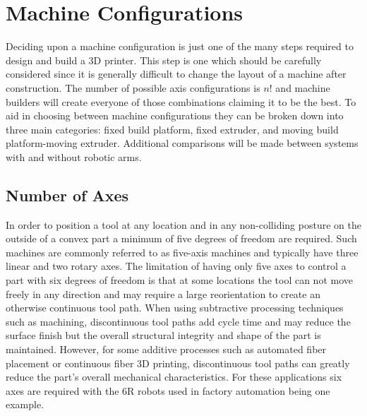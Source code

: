 \documentclass[main.tex]{subfiles}
\begin{document}
\chapter{Machine Configurations}
Deciding upon a machine configuration is just one of the many steps required to design and build a 3D printer.
This step is one which should be carefully considered since it is generally difficult to change the layout of a machine after construction.
The number of possible axis configurations is $n!$ and machine builders will create everyone of those combinations claiming it to be the best. 
To aid in choosing between machine configurations they can be broken down into three main categories: fixed build platform, fixed extruder, and moving build platform-moving extruder.
Additional comparisons will be made between systems with and without robotic arms.

\section{Number of Axes}
\label{sec:numberAxes}
In order to position a tool at any location and in any non-colliding posture on the outside of a convex part a minimum of five degrees of freedom are required.
Such machines are commonly referred to as five-axis machines and typically have three linear and two rotary axes.
The limitation of having only five axes to control a part with six degrees of freedom is that at some locations the tool can not move freely in any direction and may require a large reorientation to create an otherwise continuous tool path.
When using subtractive processing techniques such as machining, discontinuous tool paths add cycle time and may reduce the surface finish but the overall structural integrity and shape of the part is maintained.
However, for some additive processes such as automated fiber placement or continuous fiber 3D printing, discontinuous tool paths can greatly reduce the part's overall mechanical characteristics.
For these applications six axes are required with the 6R robots used in factory automation being one example.
\end{document}
